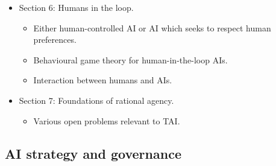 \begin{itemize}
\begin{itemize}
\begin{itemize}
\begin{itemize}
            \end{itemize}
        \end{itemize}
        \item Section 6: Humans in the loop.
        \begin{itemize}
            \item Either human-controlled AI or AI which seeks to respect human preferences.
            \item Behavioural game theory for human-in-the-loop AIs.
            \item Interaction between humans and AIs.
        \end{itemize}
        \item Section 7: Foundations of rational agency.
        \begin{itemize}
            \item Various open problems relevant to TAI.
        \end{itemize}
    \end{itemize}
\end{itemize}


\subsection{AI strategy and governance}

